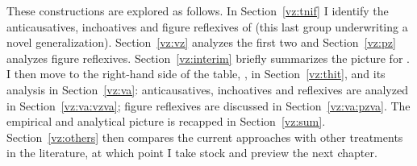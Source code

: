 These constructions are explored as follows. In Section~\ref{vz:tnif} I identify the anticausatives, inchoatives and figure reflexives of {\tnif} (this last group underwriting a novel generalization). Section~\ref{vz:vz} analyzes the first two and Section~\ref{vz:pz} analyzes figure reflexives. Section~\ref{vz:interim} briefly summarizes the picture for {\tnif}. I then move to the right-hand side of the table, {\thit}, in Section~\ref{vz:thit}, and its analysis in Section~\ref{vz:va}: anticausatives, inchoatives and reflexives are analyzed in Section~\ref{vz:va:vzva}; figure reflexives are discussed in Section~\ref{vz:va:pzva}. The empirical and analytical picture is recapped in Section~\ref{vz:sum}. Section~\ref{vz:others} then compares the current approaches with other treatments in the literature, at which point I take stock and preview the next chapter.



